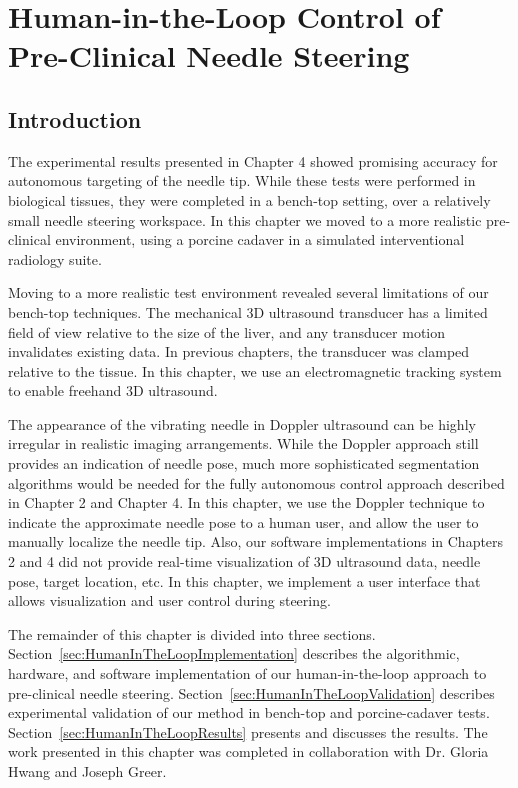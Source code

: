 \chapter[Human-in-the-Loop Control]{Human-in-the-Loop Control of Pre-Clinical Needle Steering}

\section{Introduction}
The experimental results presented in Chapter 4 showed promising accuracy for autonomous targeting of the needle tip. While these tests were performed in biological tissues, they were completed in a bench-top setting, over a relatively small needle steering workspace. In this chapter we moved to a more realistic pre-clinical environment, using a porcine cadaver in a simulated interventional radiology suite. 

Moving to a more realistic test environment revealed several limitations of our bench-top techniques. The mechanical 3D ultrasound transducer has a limited field of view relative to the size of the liver, and any transducer motion invalidates existing data. In previous chapters, the transducer was clamped relative to the tissue. In this chapter, we use an electromagnetic tracking system to enable freehand 3D ultrasound. 

The appearance of the vibrating needle in Doppler ultrasound can be highly irregular in realistic imaging arrangements. While the Doppler approach still provides an indication of needle pose, much more sophisticated segmentation algorithms would be needed for the fully autonomous control approach described in Chapter 2 and Chapter 4. In this chapter, we use the Doppler technique to indicate the approximate needle pose to a human user, and allow the user to manually localize the needle tip. Also, our software implementations in Chapters 2 and 4 did not provide real-time visualization of 3D ultrasound data, needle pose, target location, etc. In this chapter, we implement a user interface that allows visualization and user control during steering. 

The remainder of this chapter is divided into three sections. Section~\ref{sec:HumanInTheLoopImplementation} describes the algorithmic, hardware, and software implementation of our human-in-the-loop approach to pre-clinical needle steering. Section~\ref{sec:HumanInTheLoopValidation} describes experimental validation of our method in bench-top and porcine-cadaver tests. Section~\ref{sec:HumanInTheLoopResults} presents and discusses the results. The work presented in this chapter was completed in collaboration with Dr. Gloria Hwang and Joseph Greer.

